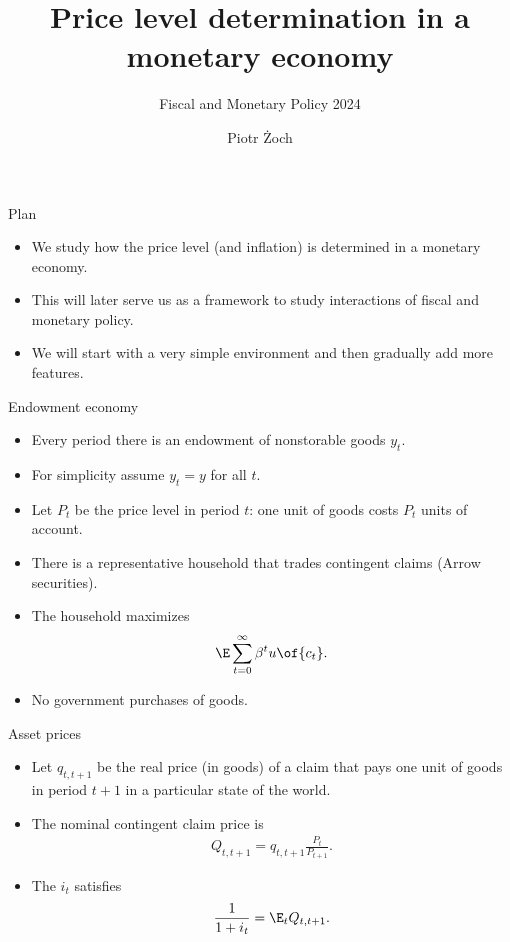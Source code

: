 \documentclass[11pt,xcolor={dvipsnames},aspectratio=159,hyperref={pdftex,pdfpagemode=UseNone,hidelinks,pdfdisplaydoctitle=true},usepdftitle=false]{beamer}
\begin{document}
\title{Price level determination in a monetary economy}
\subtitle{Fiscal and Monetary Policy 2024}

\author{Piotr Żoch}%
\frame{\titlepage}

\begin{frame}{Plan}
    \begin{itemize}
    \item We study how the price level (and inflation) is determined in a monetary economy.
    \item This will later serve us as a framework to study interactions of fiscal and monetary policy.
    \item We will start with a very simple environment and then gradually add more features.
    \end{itemize}
\end{frame}


\begin{frame}
\end{frame}

\begin{frame}{Endowment economy}
    \begin{itemize}
    \item Every period there is an endowment of nonstorable goods $y_t$.
    \item For simplicity assume $y_t = y$ for all $t$.
    \item Let $P_t$ be the price level in period $t$: one unit of goods costs $P_t$ units of account.
    \item There is a representative household that trades contingent claims (Arrow securities).
    \item The household maximizes $$\E \sum_{t=0}^\infty \beta^t u\of{c_t}.$$
    \item No government purchases of goods. 
    \end{itemize}
\end{frame}

\begin{frame}{Asset prices}
\begin{itemize}
        \item Let $q_{t,t+1}$ be the real price (in goods) of a claim that pays one unit of goods in period $t+1$ in a particular state of the world.
        \item The nominal contingent claim price is \begin{align*}
           Q_{t,t+1} = q_{t,t+1} \frac{P_t}{P_{t+1}}.
        \end{align*}
        \item The  $i_t$ satisfies \begin{align*}
            \frac{1}{1+i_t} = \E_t Q_{t,t+1}.
        \end{align*}
    \end{itemize}
\end{frame}
\end{document}
